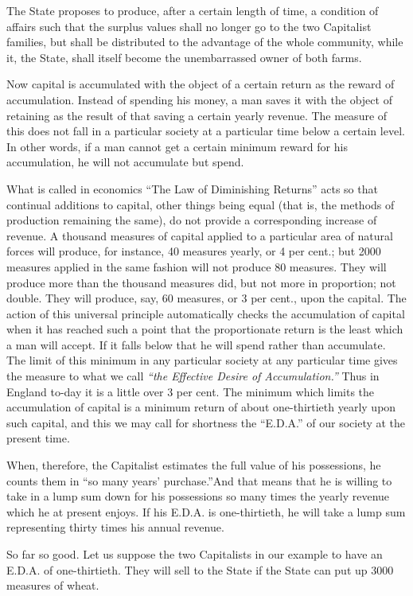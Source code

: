 \documentclass{book}
\begin{document}
The State proposes to produce, after a certain length of time, a condition of affairs such that the surplus values shall no longer go to the two Capitalist families, but shall be distributed to the advantage of the whole community, while it, the State, shall itself become the unembarrassed owner of both farms.

Now capital is accumulated with the object of a certain return as the reward of accumulation. Instead of spending his money, a man saves it with the object of retaining as the result of that saving a certain yearly revenue. The measure of this does not fall in a particular society at a particular time below a certain level. In other words, if a man cannot get a certain minimum reward for his accumulation, he will not accumulate but spend.

What is called in economics “The Law of Diminishing Returns” acts so that continual additions to capital, other things being equal (that is, the methods of production remaining the same), do not provide a corresponding increase of revenue. A thousand measures of capital applied to a particular area of natural forces will produce, for instance, 40 measures yearly, or 4 per cent.; but 2000 measures applied in the same fashion will not produce 80 measures. They will produce more than the thousand measures did, but not more in proportion; not double. They will produce, say, 60 measures, or 3 per cent., upon the capital. The action of this universal principle automatically checks the accumulation of capital when it has reached such a point that the proportionate return is the least which a man will accept. If it falls below that he will spend rather than accumulate. The limit of this minimum in any particular society at any particular time gives the measure to what we call \emph{“the Effective Desire of Accumulation.”} Thus in England to-day it is a little over 3 per cent. The minimum which limits the accumulation of capital is a minimum return of about one-thirtieth yearly upon such capital, and this we may call for shortness the “E.D.A.” of our society at the present time.

When, therefore, the Capitalist estimates the full value of his possessions, he counts them in “so many years’ purchase.”\footnotemark[1] And that means that he is willing to take in a lump sum down for his possessions so many times the yearly revenue which he at present enjoys. If his E.D.A. is one-thirtieth, he will take a lump sum representing thirty times his annual revenue.

So far so good. Let us suppose the two Capitalists in our example to have an E.D.A. of one-thirtieth. They will sell to the State if the State can put up 3000 measures of wheat.
\end{document}

